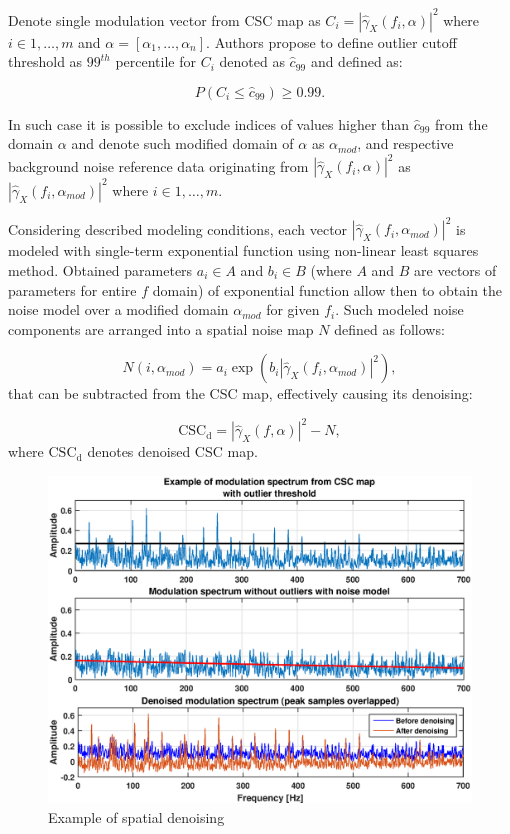\documentclass[3p, 12pt]{elsarticle} %
\begin{document}
Denote single modulation vector from CSC map as $C_i=\left|\hat{\gamma}_X(f_i,\alpha)\right|^{2}$ where $i \in 1, \dots, m$ and $\alpha = \left[\alpha_1, \dots ,\alpha_n \right]$. Authors propose to define outlier cutoff threshold as $99^{th}$ percentile for $C_i$ denoted as $\hat{c}_{99}$ and defined as:

\begin{equation}
    P\left( C_i\leq\hat{c}_{99} \right)\geq 0.99.
\end{equation}

In such case it is possible to exclude indices of values higher than $\hat{c}_{99}$ from the domain $\alpha$ and denote such modified domain of $\alpha$ as $\alpha_{mod}$, and respective background noise reference data originating from $\left|\hat{\gamma}_X(f_i,\alpha)\right|^{2}$ as $\left|\hat{\gamma}_X(f_i,\alpha_{mod})\right|^{2}$ where $i \in 1, \dots, m$.

Considering described modeling conditions, each vector $\left|\hat{\gamma}_X(f_i,\alpha_{mod})\right|^{2}$ is modeled with single-term exponential function using non-linear least squares method. Obtained parameters $a_i \in A$ and $b_i \in B$ (where $A$ and $B$ are vectors of parameters for entire $f$ domain) of exponential function allow then to obtain the noise model over a modified domain $\alpha_{mod}$ for given $f_i$. Such modeled noise components are arranged into a spatial noise map $N$ defined as follows:

\begin{equation}
   N(i,\alpha_{mod})=a_i \exp \left( b_i \left|\hat{\gamma}_X(f_i,\alpha_{mod})\right|^{2}\right),
\end{equation}
that can be subtracted from the CSC map, effectively causing its denoising:

\begin{equation}
   \mathrm{CSC_d}= \left|\hat{\gamma}_X(f,\alpha)\right|^{2}-N,
\end{equation}
where $\mathrm{CSC_d}$ denotes denoised CSC map.

\begin{figure}[ht!]
\centering
\includegraphics[width=.8\textwidth]{wykresy/ex}
\caption{Example of spatial denoising}
\label{fig:ex}
\end{figure}
\end{document}
